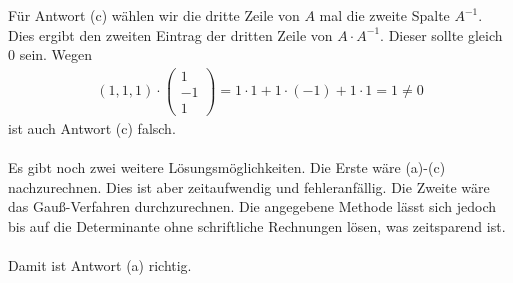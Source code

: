 Für Antwort (c) wählen wir  die dritte Zeile von $A$ mal die zweite Spalte $A^{-1}$.
Dies ergibt den zweiten Eintrag der dritten Zeile von $A \cdot A^{-1}$. Dieser sollte gleich $0$ sein.
Wegen
\begin{align*}
(1,1,1) \cdot
\begin{pmatrix}
1\\
-1 \\
1
\end{pmatrix}
= 1 \cdot 1 + 1 \cdot (-1) + 1 \cdot 1
= 1 \neq 0
\end{align*}
ist auch Antwort (c) falsch.\\
\\
Es gibt noch zwei weitere Lösungsmöglichkeiten.
Die Erste wäre (a)-(c) nachzurechnen. 
Dies ist aber zeitaufwendig und fehleranfällig.
Die Zweite wäre das Gauß-Verfahren durchzurechnen.
Die angegebene Methode lässt sich jedoch bis auf die Determinante ohne schriftliche Rechnungen lösen, was zeitsparend ist.
\\
\ \\
Damit ist Antwort (a) richtig.
\newpage
